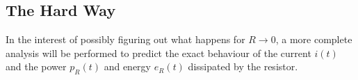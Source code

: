 \subsection{The Hard Way}

In the  interest  of  possibly  figuring out what happens for $R\to 0$, a more
complete  analysis  will  be  performed  to predict the exact behaviour of the
current  $i(t)$ and the power $p_R(t)$ and energy $e_R(t)$ dissipated  by  the
resistor.



